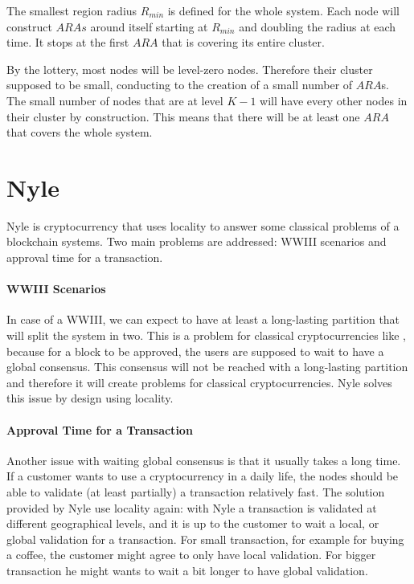 \documentclass[a4paper,11pt,oneside]{report}
\begin{document}
The smallest region radius $R_{min}$ is defined for the whole system. Each node
will construct $ARAs$ around itself starting at $R_{min}$ and doubling the
radius at each time. It stops at the first $ARA$ that is covering its entire
cluster. 

By the lottery, most nodes will be level-zero nodes. Therefore their cluster
supposed to be small, conducting to the creation of a small number of $ARA$s.
The small number of nodes that are at level $K-1$ will have every other nodes
in their cluster by construction. This means that there will be at least one
$ARA$ that covers the whole system. 

\section{Nyle}

Nyle is cryptocurrency that uses locality to answer some classical problems of
a blockchain systems. Two main problems are addressed: WWIII scenarios and
approval time for a transaction.
 
\paragraph{WWIII Scenarios} \label{WWIII} In case of a WWIII, we can expect to have
at least a long-lasting partition that will split the system in two. This is a
problem for classical cryptocurrencies like \cite{Nakamoto2009}, because for a
block to be approved, the users are supposed to wait to have a global
consensus. This consensus will not be reached with a long-lasting partition and
therefore it will create problems for classical cryptocurrencies. Nyle solves
this issue by design using locality.

\paragraph{Approval Time for a Transaction} \label{approve_time} Another issue
with waiting global consensus is that it usually takes a long time. If a
customer wants to use a cryptocurrency in a daily life, the nodes should be 
able to validate (at least partially) a transaction relatively fast. The
solution provided by Nyle use locality again: with Nyle a transaction is
validated at different geographical levels, and it is up to the customer to wait a local, or
global validation for a transaction. For small transaction, for example for
buying a coffee, the customer might agree to only have local validation. For
bigger transaction he might wants to wait a bit longer to have global
validation.
\end{document}
